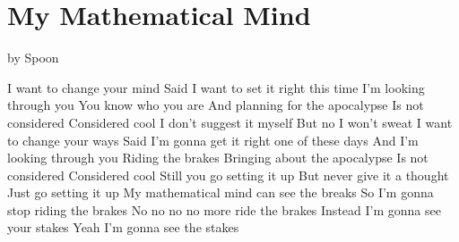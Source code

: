 \documentclass[numberinsequence]{krantz}
\begin{document}
\hypertarget{my-mathematical-mind}{%
\section{My Mathematical Mind}\label{my-mathematical-mind}}

by Spoon

I want to change your mind Said I want to set it right this time I'm
looking through you You know who you are And planning for the apocalypse
Is not considered Considered cool I don't suggest it myself But no I
won't sweat I want to change your ways Said I'm gonna get it right one
of these days And I'm looking through you Riding the brakes Bringing
about the apocalypse Is not considered Considered cool Still you go
setting it up But never give it a thought Just go setting it up My
mathematical mind can see the breaks So I'm gonna stop riding the brakes
No no no no more ride the brakes Instead I'm gonna see your stakes Yeah
I'm gonna see the stakes



\backmatter
\printindex
\end{document}
